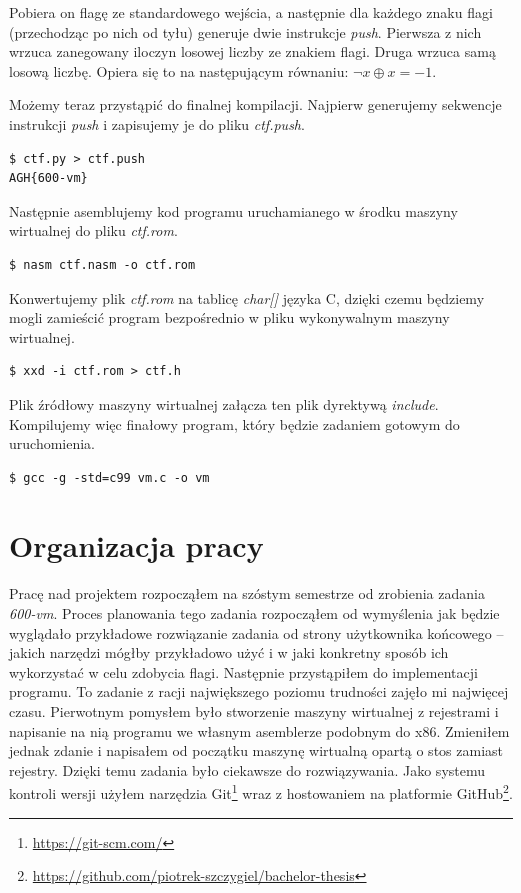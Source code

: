 \documentclass[language=polish,type=eng]{aghmodern}
\begin{document}
Pobiera on flagę ze standardowego wejścia, a następnie dla każdego znaku flagi
(przechodząc po nich od tyłu) generuje dwie instrukcje \emph{push}.
Pierwsza z nich wrzuca zanegowany iloczyn losowej liczby ze znakiem flagi.
Druga wrzuca samą losową liczbę. Opiera się to na następującym równaniu:
\( \neg x \oplus x = -1 \).

Możemy teraz przystąpić do finalnej kompilacji. Najpierw generujemy sekwencje
instrukcji \emph{push} i zapisujemy je do pliku \emph{ctf.push}.

\begin{verbatim}
$ ctf.py > ctf.push
AGH{600-vm}
\end{verbatim}

Następnie asemblujemy kod programu uruchamianego w środku maszyny wirtualnej
do pliku \emph{ctf.rom}.

\begin{verbatim}
$ nasm ctf.nasm -o ctf.rom
\end{verbatim}

Konwertujemy plik \emph{ctf.rom} na tablicę \emph{char[]} języka C, dzięki czemu
będziemy mogli zamieścić program bezpośrednio w pliku wykonywalnym maszyny
wirtualnej.

\begin{verbatim}
$ xxd -i ctf.rom > ctf.h
\end{verbatim}

Plik źródłowy maszyny wirtualnej załącza ten plik dyrektywą \emph{include}.
Kompilujemy więc finałowy program, który będzie zadaniem gotowym do uruchomienia.

\begin{verbatim}
$ gcc -g -std=c99 vm.c -o vm
\end{verbatim}

\chapter{Organizacja pracy}

Pracę nad projektem rozpocząłem na szóstym semestrze od zrobienia zadania \emph{600-vm}.
Proces planowania tego zadania rozpocząłem od wymyślenia jak będzie wyglądało
przykładowe rozwiązanie zadania od strony użytkownika
końcowego -- jakich narzędzi mógłby przykładowo użyć i w jaki konkretny sposób ich wykorzystać
w celu zdobycia flagi. Następnie przystąpiłem do implementacji programu.
To zadanie z racji największego poziomu trudności zajęło mi
najwięcej czasu. Pierwotnym pomysłem było stworzenie maszyny wirtualnej z rejestrami
i napisanie na nią programu we własnym asemblerze podobnym do x86. Zmieniłem jednak
zdanie i napisałem od początku maszynę wirtualną opartą o stos zamiast rejestry.
Dzięki temu zadania było ciekawsze do rozwiązywania.
Jako systemu kontroli wersji użyłem narzędzia
Git\footnote{\url{https://git-scm.com/}} wraz z hostowaniem na platformie GitHub\footnote{
\url{https://github.com/piotrek-szczygiel/bachelor-thesis}}.
\end{document}
